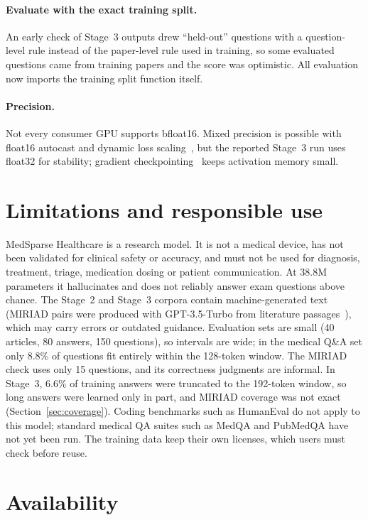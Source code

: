 \documentclass[11pt,a4paper]{article}
\begin{document}
\paragraph{Evaluate with the exact training split.} An early check of Stage~3 outputs drew ``held-out'' questions with a question-level rule instead of the paper-level rule used in training, so some evaluated questions came from training papers and the score was optimistic. All evaluation now imports the training split function itself.

\paragraph{Precision.} Not every consumer GPU supports bfloat16. Mixed precision is possible with float16 autocast and dynamic loss scaling~\citep{micikevicius2018mixed}, but the reported Stage~3 run uses float32 for stability; gradient checkpointing~\citep{chen2016checkpointing} keeps activation memory small.

\section{Limitations and responsible use}

MedSparse Healthcare is a research model. It is not a medical device, has not been validated for clinical safety or accuracy, and must not be used for diagnosis, treatment, triage, medication dosing or patient communication. At 38.8M parameters it hallucinates and does not reliably answer exam questions above chance. The Stage~2 and Stage~3 corpora contain machine-generated text (MIRIAD pairs were produced with GPT-3.5-Turbo from literature passages~\citep{zheng2025miriad}), which may carry errors or outdated guidance. Evaluation sets are small (40 articles, 80 answers, 150 questions), so intervals are wide; in the medical Q\&A set only 8.8\% of questions fit entirely within the 128-token window. The MIRIAD check uses only 15 questions, and its correctness judgments are informal. In Stage~3, 6.6\% of training answers were truncated to the 192-token window, so long answers were learned only in part, and MIRIAD coverage was not exact (Section~\ref{sec:coverage}). Coding benchmarks such as HumanEval do not apply to this model; standard medical QA suites such as MedQA and PubMedQA have not yet been run. The training data keep their own licenses, which users must check before reuse.

\section{Availability}
\end{document}
